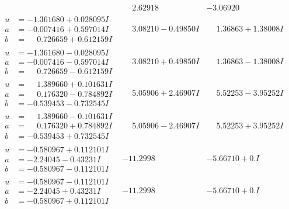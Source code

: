 \documentclass[1p]{elsarticle_modified}
\theoremstyle{definition}
\begin{document}
$$\begin{array}{c|c|c}
 & \phantom{-}2.62918\phantom{ +0.000000I} & -3.06920\phantom{ +0.000000I} \\ \hline\begin{aligned}
u &= -1.361680 + 0.028095 I \\
a &= -0.007416 + 0.597014 I \\
b &= \phantom{-}0.726659 + 0.612159 I\end{aligned}
 & \phantom{-}3.08210 - 0.49850 I & \phantom{-}1.36863 + 1.38008 I \\ \hline\begin{aligned}
u &= -1.361680 - 0.028095 I \\
a &= -0.007416 - 0.597014 I \\
b &= \phantom{-}0.726659 - 0.612159 I\end{aligned}
 & \phantom{-}3.08210 + 0.49850 I & \phantom{-}1.36863 - 1.38008 I \\ \hline\begin{aligned}
u &= \phantom{-}1.389660 + 0.101631 I \\
a &= \phantom{-}0.176320 - 0.784892 I \\
b &= -0.539453 - 0.732545 I\end{aligned}
 & \phantom{-}5.05906 + 2.46907 I & \phantom{-}5.52253 - 3.95252 I \\ \hline\begin{aligned}
u &= \phantom{-}1.389660 - 0.101631 I \\
a &= \phantom{-}0.176320 + 0.784892 I \\
b &= -0.539453 + 0.732545 I\end{aligned}
 & \phantom{-}5.05906 - 2.46907 I & \phantom{-}5.52253 + 3.95252 I \\ \hline\begin{aligned}
u &= -0.580967 + 0.112101 I \\
a &= -2.24045 - 0.43231 I \\
b &= -0.580967 - 0.112101 I\end{aligned}
 & -11.2998\phantom{ +0.000000I} & -5.66710 + 0. I\phantom{ +0.000000I} \\ \hline\begin{aligned}
u &= -0.580967 - 0.112101 I \\
a &= -2.24045 + 0.43231 I \\
b &= -0.580967 + 0.112101 I\end{aligned}
 & -11.2998\phantom{ +0.000000I} & -5.66710 + 0. I\phantom{ +0.000000I} \\ \hline\begin{aligned}

\end{aligned}
\end{array}$$
\end{document}
